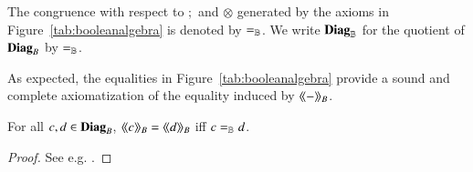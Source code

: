 The congruence with respect to $;$ and $\otimes$ generated by the axioms in Figure~\ref{tab:booleanalgebra} is denoted by $=_{\mathbb{B}}$. 
We write $\mathbf{Diag}_{\mathbb{B}}$ for the quotient of $\mathbf{Diag}_{B}$ by $=_{\mathbb{B}}$.

As expected, the equalities in Figure~\ref{tab:booleanalgebra} provide a sound and complete axiomatization of the equality induced by $\langle\!\langle{-}\rangle\! \rangle_B$.

\begin{theorem}\label{thm:completenessbooleancircuits}
For all  $c,d\in \mathbf{Diag}_{B}$, $\langle\!\langle{c}\rangle\! \rangle_B=\langle\!\langle{d}\rangle\! \rangle_B$ iff $c=_{\mathbb{B}} d$.
\end{theorem}
\begin{proof}
See e.g. \cite[Theorem 3.2]{piedeleu2025boolean}.
\end{proof}



